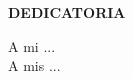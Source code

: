 \begin{center}
	{\bf\expandafter\uppercase\expandafter{Dedicatoria}}\\
\end{center}
A mi ...\\
\lipsum[1-3]
A mis ...